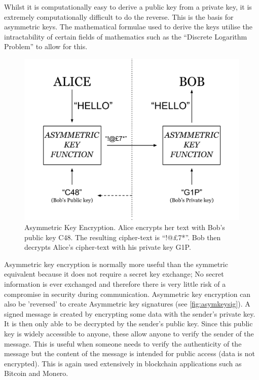 \documentclass{article}
\begin{document}
Whilst it is computationally easy to derive a public key from a private key, it is extremely computationally difficult to do the reverse. This is the basis for asymmetric keys. The mathematical formulae used to derive the keys utilise the intractability of certain fields of mathematics such as the ``Discrete Logarithm Problem'' to allow for this.

\begin{figure}[h]
    \centering
    \includegraphics[width=0.6\linewidth]{Images/Diagrams/asymmetric_key_encryption.png}
    \caption{Asymmetric Key Encryption. Alice encrypts her text with Bob's public key C48. The resulting cipher-text is ``!@£7*''. Bob then decrypts Alice's cipher-text with his private key G1P.}
    \label{fig:asymkeyenc}
\end{figure}

Asymmetric key encryption is normally more useful than the symmetric equivalent because it does not require a secret key exchange; No secret information is ever exchanged and therefore there is very little risk of a compromise in security during communication.
Asymmetric key encryption can also be 'reversed' to create Asymmetric key signatures (see \autoref{fig:asymkeysig}). A signed message is created by encrypting some data with the sender's private key. It is then only able to be decrypted by the sender's public key. Since this public key is widely accessible to anyone, these allow anyone to verify the sender of the message. This is useful when someone needs to verify the authenticity of the message but the content of the message is intended for public access (data is not encrypted). This is again used extensively in blockchain applications such as Bitcoin and Monero.
\end{document}
